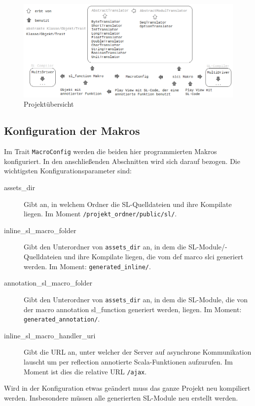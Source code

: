 \documentclass[12pt,bibtotoc]{scrreprt}
\begin{document}
\begin{figure}[h] 
  \centering
     \includegraphics[width=\textwidth]{Bilder/projektstruktur}
  \caption{Projektübersicht}
  \label{fig:project-overview}
\end{figure}

\subsection{Konfiguration der Makros}
\label{subsec:macro-config}

Im Trait \lstinline!MacroConfig! werden die beiden hier programmierten Makros konfiguriert. In den anschließenden Abschnitten wird sich darauf bezogen. Die wichtigsten Konfigurationsparameter sind:

\begin{description}
 \item[assets\_dir] Gibt an, in welchem Ordner die SL-Quelldateien und ihre Kompilate liegen. Im Moment \lstinline!/projekt_ordner/public/sl/!.
 \item[inline\_sl\_macro\_folder] Gibt den Unterordner von \lstinline!assets_dir! an, in dem die SL-Module/-Quelldateien und ihre Kompilate liegen, die vom def marco slci generiert werden. Im Moment: \lstinline!generated_inline/!.
 \item[annotation\_sl\_macro\_folder] Gibt den Unterordner von \lstinline!assets_dir! an, in dem die SL-Module, die von der macro annotation sl\_function generiert werden, liegen. Im Moment: \lstinline!generated_annotation/!.
 \item[inline\_sl\_macro\_handler\_uri] Gibt die \ac{URL} an, unter welcher der Server auf asynchrone Kommunikation lauscht um per reflection annotierte Scala-Funktionen aufzurufen. Im Moment ist dies die relative \ac{URL} \lstinline!/ajax!.
\end{description}

Wird in der Konfiguration etwas geändert muss das ganze Projekt neu kompiliert werden. Insbesondere müssen alle generierten SL-Module neu erstellt werden.
\end{document}

